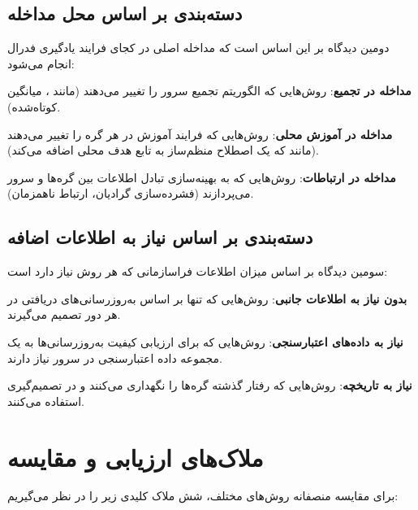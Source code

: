 \subsection{دسته‌بندی بر اساس محل مداخله}

دومین دیدگاه بر این اساس است که مداخله اصلی در کجای فرایند یادگیری فدرال انجام می‌شود:

\begin{itemize}
    \tick \textbf{مداخله در تجمیع}: روش‌هایی که الگوریتم تجمیع سرور را تغییر می‌دهند (مانند ، میانگین کوتاه‌شده).
    
    \tick \textbf{مداخله در آموزش محلی}: روش‌هایی که فرایند آموزش در هر گره را تغییر می‌دهند (مانند  که یک اصطلاح منظم‌ساز به تابع هدف محلی اضافه می‌کند).
    
    \tick \textbf{مداخله در ارتباطات}: روش‌هایی که به بهینه‌سازی تبادل اطلاعات بین گره‌ها و سرور می‌پردازند (فشرده‌سازی گرادیان، ارتباط ناهمزمان).
\end{itemize}

\subsection{دسته‌بندی بر اساس نیاز به اطلاعات اضافه}

سومین دیدگاه بر اساس میزان اطلاعات فراسازمانی که هر روش نیاز دارد است:

\begin{itemize}
    \tick \textbf{بدون نیاز به اطلاعات جانبی}: روش‌هایی که تنها بر اساس به‌روزرسانی‌های دریافتی در هر دور تصمیم می‌گیرند.
    
    \tick \textbf{نیاز به داده‌های اعتبارسنجی}: روش‌هایی که برای ارزیابی کیفیت به‌روزرسانی‌ها به یک مجموعه داده اعتبارسنجی در سرور نیاز دارند.
    
    \tick \textbf{نیاز به تاریخچه}: روش‌هایی که رفتار گذشته گره‌ها را نگهداری می‌کنند و در تصمیم‌گیری استفاده می‌کنند.
\end{itemize}


\section{ملاک‌های ارزیابی و مقایسه}
\label{sec:rw_criteria}

برای مقایسه منصفانه روش‌های مختلف، شش ملاک کلیدی زیر را در نظر می‌گیریم:

